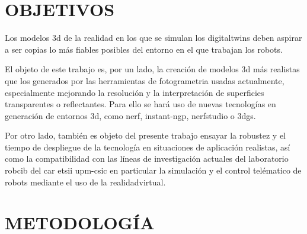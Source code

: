 \documentclass[a4paper, 12pt, spanish, twoside]{article}
\begin{document}




\newpage
\section{OBJETIVOS} \label{sec:objetivos}

Los modelos \acrshort{3d} de la realidad en los que se simulan los \glspl{digitaltwin} deben aspirar a ser copias lo más fiables posibles del entorno en el que trabajan los robots.  

El objeto de este trabajo es, por un lado, la creación de modelos \acrshort{3d} más realistas que los generados por las herramientas de \gls{fotogrametria} usadas actualmente, especialmente mejorando la resolución y la interpretación de superficies transparentes o reflectantes. Para ello se hará uso de nuevas tecnologías en generación de entornos \acrshort{3d}, como \acrfull{nerf}, \gls{instant-ngp}, \gls{nerfstudio} o \acrfull{3dgs}. 

Por otro lado, también es objeto del presente trabajo ensayar la robustez y el tiempo de despliegue de la tecnología en situaciones de aplicación realistas, así como la compatibilidad con las líneas de investigación actuales del laboratorio \acrfull{robcib} del \acrshort{car} \acrshort{etsii} \acrshort{upm}-\acrshort{csic} en particular la simulación y el control telématico de robots mediante el uso de la \gls{realidadvirtual}. 

\clearpage





\newpage
\section{METODOLOGÍA} \label{sec:metodologia}


\end{document}
